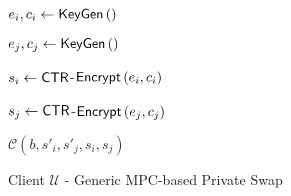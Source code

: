 \noindent
\begin{figure} [H]
    \begin{minipage}{0.5\textwidth}
        \begin{algorithm}[H]
            \LinesNumbered
            \caption{Client $ \mathcal{U} $ - \newline Generic MPC-based Private Swap}
            \label{algo:ClientBooleanPS}
    
            \KwOut{\phantom{$ C_i, C_j $}}
    
            \vspace*{0.48cm}
    
    
    
            $ e_i, c_i \gets \mathsf{{KeyGen}} \left(\right) $
    
            $ e_j, c_j \gets \mathsf{{KeyGen}} \left(\right) $
    
            $ s_i \gets \mathsf{{CTR}} $-$ \mathsf{{Encrypt}} \left( e_i, c_i \right) $
    
            $ s_j \gets \mathsf{{CTR}} $-$ \mathsf{{Encrypt}} \left( e_j, c_j \right) $
    
            \MPC{} {
    
    
                \KwOut{\phantom{$ C_i, C_j $}}
    
                \vspace*{0.48cm}
    
                $ \mathcal{C}\left( b, s'_i, s'_j, s_i, s_j \right) $
    
}
\end{algorithm}
\end{minipage}
\end{figure}
